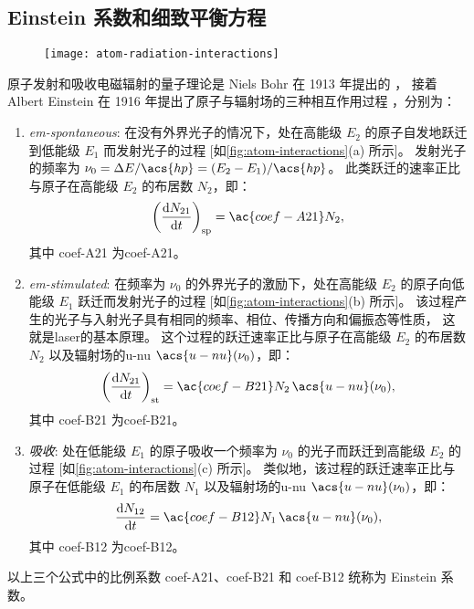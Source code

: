 \subsection{Einstein 系数和细致平衡方程}

\begin{figure}[htp]
  \centering
  \texttt{[image: atom-radiation-interactions]}
  \label{fig:atom-interactions}
\end{figure}

原子发射和吸收电磁辐射的量子理论是 Niels Bohr 在 1913 年提出的 \cite{bohr1913}，
接着 Albert Einstein 在 1916 年提出了原子与辐射场的三种相互作用过程
\cite{einstein1916}，分别为：
\begin{enumerate}
\item \emph{\acf{em-spontaneous}}:
  在没有外界光子的情况下，处在高能级 $E_2$ 的原子自发地跃迁到低能级 $E_1$
  而发射光子的过程 [如\autoref{fig:atom-interactions}(a) 所示]。
  发射光子的频率为 $\nu_0 = \Delta E / \acs{hp} = (E_2 - E_1) / \acs{hp}$。
  此类跃迁的速率正比与原子在高能级 $E_2$ 的布居数 $N_2$，即：
  \begin{equation}
    \label{eq:rate-em-spontaneous}
    \left( \diff{N_{21}}{t} \right)_{\R{sp}} = \ac{coef-A21} N_2 ,
  \end{equation}
  其中 \ac{coef-A21} 为\acl{coef-A21}。

\item \emph{\acf{em-stimulated}}:
  在频率为 $\nu_0$ 的外界光子的激励下，处在高能级 $E_2$ 的原子向低能级 $E_1$
  跃迁而发射光子的过程 [如\autoref{fig:atom-interactions}(b) 所示]。
  该过程产生的光子与入射光子具有相同的频率、相位、传播方向和偏振态等性质，
  这就是\acf{laser}的基本原理。
  这个过程的跃迁速率正比与原子在高能级 $E_2$ 的布居数 $N_2$
  以及辐射场的\acl{u-nu} $\acs{u-nu}(\nu_0)$，即：
  \begin{equation}
    \label{eq:rate-em-stimulated}
    \left( \diff{N_{21}}{t} \right)_{\R{st}}
      = \ac{coef-B21} N_2 \, \acs{u-nu}(\nu_0) ,
  \end{equation}
  其中 \ac{coef-B21} 为\acl{coef-B21}。

\item \emph{吸收}:
  处在低能级 $E_1$ 的原子吸收一个频率为 $\nu_0$ 的光子而跃迁到高能级 $E_2$ 的过程
  [如\autoref{fig:atom-interactions}(c) 所示]。
  类似地，该过程的跃迁速率正比与原子在低能级 $E_1$ 的布居数 $N_1$
  以及辐射场的\acl{u-nu} $\acs{u-nu}(\nu_0)$，即：
  \begin{equation}
    \label{eq:rate-absorption}
    \diff{N_{12}}{t} = \ac{coef-B12} N_1 \, \acs{u-nu}(\nu_0) ,
  \end{equation}
  其中 \ac{coef-B12} 为\acl{coef-B12}。
\end{enumerate}
以上三个公式中的比例系数 \ac{coef-A21}、\ac{coef-B21} 和 \ac{coef-B12}
统称为 Einstein 系数。

